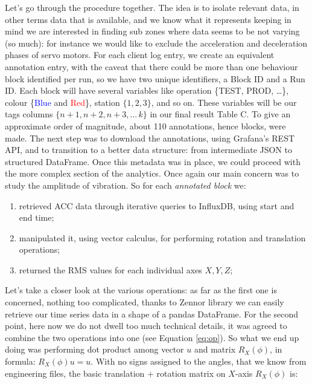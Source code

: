 Let's go through the procedure together. %
The idea is to isolate relevant data, in other terms data that is available, and we know what it represents keeping in mind we are interested in finding sub zones 
where data seems to be not varying (so much): for instance we would like to exclude the acceleration and deceleration phases of servo motors.
For each client log entry, we create an equivalent annotation entry, with the caveat that there could be more than one behaviour block identified per run, so we have two unique identifiers, a Block ID and a Run ID. 
Each block will have several variables like operation \{TEST, PROD, \dots\}, colour \{\textcolor{blue}{Blue} and \textcolor{red}{Red}\}, station $\{1,2,3\}$, and so on. 
These variables will be our tags columns $\{n+1, n+2, n+3, \dots\, k\}$ in our final result Table C. To give an approximate order of magnitude, about 110 annotations, hence blocks, were made.
The next step was to download the annotations, using Grafana's REST API, and to transition to a better data structure: from intermediate JSON to structured DataFrame.
Once this metadata was in place, we could proceed with the more complex section of the analytics.
Once again our main concern was to study the amplitude of vibration. So for each \emph{annotated block} we: 
\begin{enumerate}
    \item retrieved ACC data through iterative queries to InfluxDB, using start and end time;
    \item manipulated it, using vector calculus, for performing rotation and translation operations;
    \item returned the \ac{RMS} values for each individual axes $X,Y,Z$;
\end{enumerate}
Let's take a closer look at the various operations: %
as far as the first one is concerned, nothing too complicated, thanks to Zennor library we can easily retrieve our time series data in a shape of a pandas DataFrame.
For the second point, here now we do not dwell too much technical details, it was agreed to combine the two operations into one (see Equation \ref{eq:op}).
So what we end up doing was performing dot product among vector $u$ and matrix $R_X(\phi)$, in formula: $R_X(\phi)u = u$.
With no signs assigned to the angles, that we know from engineering files, the basic translation $+$ rotation matrix on $X$-axis $R_X(\phi)$ is:
